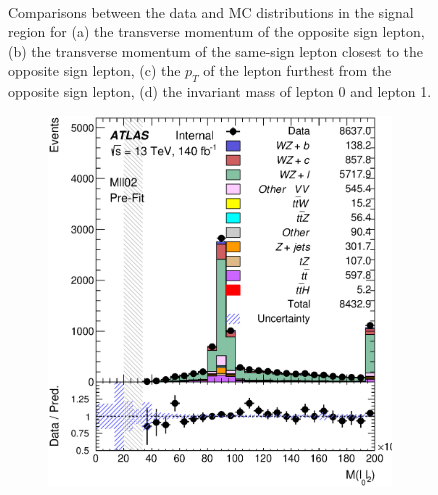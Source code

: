 \documentclass[NOTE, atlasdraft=true, texlive=2016, UKenglish]{\ATLASLATEXPATH atlasdoc}
\begin{document}
\begin{figure}[H]
\begin{subfigure}{.48\textwidth}
        \caption{}
        \label{fig:Mll01}
    \end{subfigure}\\ 
    \caption{Comparisons between the data and MC distributions in the signal region for (a) the transverse momentum of the opposite sign lepton, (b) the transverse momentum of the same-sign lepton closest to the opposite sign lepton, (c) the $p_T$ of the lepton furthest from the opposite sign lepton, (d) the invariant mass of lepton 0 and lepton 1.}
\end{figure}
\begin{figure}[H]
    \begin{subfigure}{.48\textwidth}
        \includegraphics[width=1\linewidth]{kinematics/Mll02.eps}
        \caption{}
        \label{fig:Mll02}
    \end{subfigure}%
    \begin{subfigure}{.48\textwidth}

\end{subfigure}
\end{figure}
\end{document}

